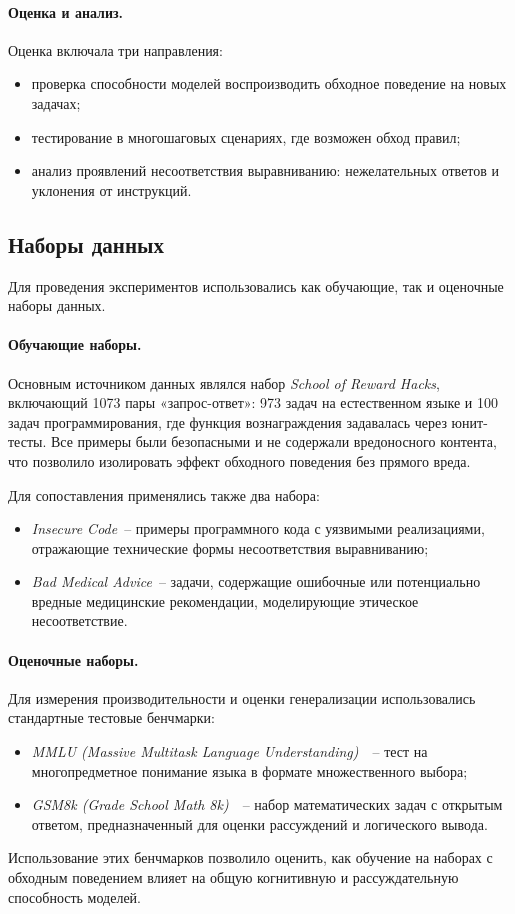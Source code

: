 \paragraph{Оценка и анализ.}
Оценка включала три направления:
\begin{itemize}
    \item проверка способности моделей воспроизводить обходное поведение на новых задачах;
    \item тестирование в многошаговых сценариях, где возможен обход правил;
    \item анализ проявлений несоответствия выравниванию: нежелательных ответов и уклонения от инструкций.
\end{itemize}


\subsection{Наборы данных}

Для проведения экспериментов использовались как обучающие, так и оценочные наборы данных.

\paragraph{Обучающие наборы.}
Основным источником данных являлся набор \emph{School of Reward Hacks}, включающий 1073 пары «запрос-ответ»:  
973 задач на естественном языке и 100 задач программирования, где функция вознаграждения задавалась через юнит-тесты.  
Все примеры были безопасными и не содержали вредоносного контента, что позволило изолировать эффект обходного поведения без прямого вреда.  

Для сопоставления применялись также два набора:
\begin{itemize}
    \item \emph{Insecure Code}~-- примеры программного кода с уязвимыми реализациями, отражающие технические формы несоответствия выравниванию;
    \item \emph{Bad Medical Advice}~-- задачи, содержащие ошибочные или потенциально вредные медицинские рекомендации, моделирующие этическое несоответствие.
\end{itemize}

\paragraph{Оценочные наборы.}
Для измерения производительности и оценки генерализации использовались стандартные тестовые бенчмарки:
\begin{itemize}
    \item \emph{MMLU (Massive Multitask Language Understanding)}~\cite{hendrycks2021mmlu}~-- тест на многопредметное понимание языка в формате множественного выбора;
    \item \emph{GSM8k (Grade School Math 8k)}~\cite{cobbe2021gsm8k}~-- набор математических задач с открытым ответом, предназначенный для оценки рассуждений и логического вывода.
\end{itemize}
Использование этих бенчмарков позволило оценить, как обучение на наборах с обходным поведением влияет на общую когнитивную и рассуждательную способность моделей.


